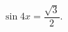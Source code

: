 \begin{ex}[type=equation]
	\begin{condition}
		$\ \sin 4x =\dfrac{\sqrt{3}}{2}. $
	\end{condition}
\end{ex}